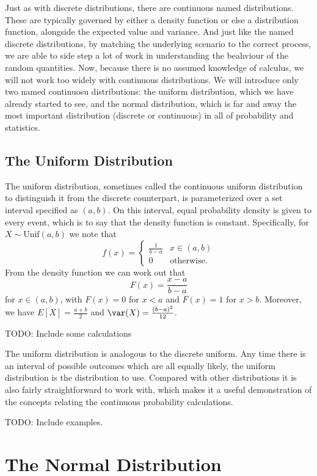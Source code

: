 \documentclass[
  letterpaper,
  DIV=11,
  numbers=noendperiod]{scrreprt}
\begin{document}
Just as with discrete distributions, there are continuous named
distributions. These are typically governed by either a density function
or else a distribution function, alongside the expected value and
variance. And just like the named discrete distributions, by matching
the underlying scenario to the correct process, we are able to side step
a lot of work in understanding the beahviour of the random quantities.
Now, because there is no assumed knowledge of calculus, we will not work
too widely with continuous distributions. We will introduce only two
named continuosu distributions: the uniform distribution, which we have
already started to see, and the normal distribution, which is far and
away the most important distribution (discrete or continuous) in all of
probability and statistics.

\section{The Uniform Distribution}\label{the-uniform-distribution}

The uniform distribution, sometimes called the continuous uniform
distribution to distinguish it from the discrete counterpart, is
parameterized over a set interval specified as \((a,b)\). On this
interval, equal probability density is given to every event, which is to
say that the density function is constant. Specifically, for
\(X\sim\text{Unif}(a,b)\) we note that
\[f(x) = \begin{cases}\frac{1}{b-a} & x \in (a,b) \\ 0 & \text{otherwise}.\end{cases}\]
From the density function we can work out that
\[F(x) = \frac{x - a}{b - a}\] for \(x \in (a,b)\), with \(F(x) = 0\)
for \(x < a\) and \(F(x) = 1\) for \(x > b\). Moreover, we have
\(E[X] = \frac{a+b}{2}\) and \(\var(X) = \frac{(b-a)^2}{12}\).

TODO: Include some calculations

The uniform distribution is analogous to the discrete uniform. Any time
there is an interval of possible outcomes which are all equally likely,
the uniform distribution is the distribution to use. Compared with other
distributions it is also fairly straightforward to work with, which
makes it a useful demonstration of the concepts relating the continuous
probability calculations.

TODO: Include examples.

\chapter{The Normal Distribution}\label{the-normal-distribution}
\end{document}
